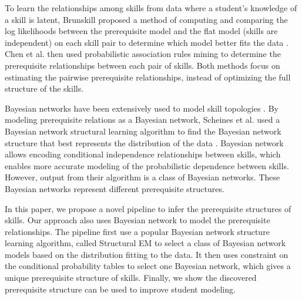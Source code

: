 \documentclass{edm_template}
\begin{document}
To learn the relationships among skills from data where a student's knowledge of a skill is latent, 
Brunskill proposed a method of computing and comparing the log likelihoods between the prerequisite model and the flat model (skills are independent) 
on each skill pair to determine which model better fits the data \cite{brunskill2010estimating}. 
Chen et al. \cite{chen2015discovering} then used probabilistic association rules mining to determine the prerequisite relationships between each pair of skills.
Both methods focus on estimating the pairwise prerequisite relationships, instead of optimizing the full structure of the skills.

Bayesian networks have been extensively used to model skill topologies \cite{kaser2014beyond}.
By modeling prerequisite relations as a Bayesian network, Scheines et al. used a Bayesian network structural learning algorithm to find the Bayesian network structure that best represents the distribution of the data \cite{scheines2014discovering}.
Bayesian network allows encoding conditional independence relationships between skills, which enables more accurate modeling of the probabilistic dependence between skills.
However, output from their algorithm is a class of Bayesian networks. These Bayesian networks represent different prerequisite structures.

In this paper, we propose a novel pipeline to infer the prerequisite structures of skills. Our approach also uses Bayesian network to model the prerequisite relationships.
The pipeline first use a popular Bayesian network structure learning algorithm, 
called Structural EM to select a class of Bayesian network models based on the distribution fitting to the data.
It then uses constraint on the conditional probability tables to select one Bayesian network, which gives a unique prerequisite structure of skills.
Finally, we show the discovered prerequisite structure can be used to improve student modeling.
\end{document}
